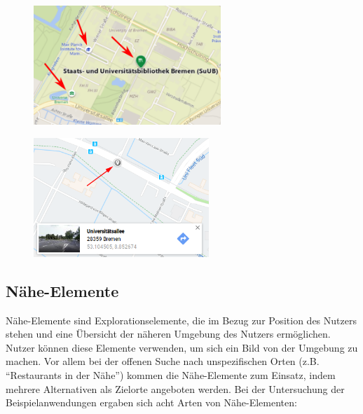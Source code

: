 \begin{figure}
    \centering
    \begin{minipage}[t]{.485\textwidth}
        \centering
        \vspace{0pt}
        \includegraphics[width=\linewidth, height=4.5cm]{figures/map-app_examples/bm_gebaeudemarkierungen_arrows}
        \label{fig:bm_gebaeudemarkierungen}
        \vfill
    \end{minipage}
    \hfill
    \begin{minipage}[t]{.485\textwidth}
        \centering
        \vspace{0pt}
        \includegraphics[width=\linewidth, height=4.5cm]{figures/map-app_examples/gm_klickmarkierung}
        \label{fig:gm_klickmarkierung}
    \end{minipage}
\end{figure}

\subsection{Nähe-Elemente}
\label{ssec:prox-elements}
Nähe-Elemente sind Explorationselemente, die im Bezug zur Position des Nutzers stehen und eine Übersicht der näheren Umgebung des Nutzers ermöglichen.
Nutzer können diese Elemente verwenden, um sich ein Bild von der Umgebung zu machen.
Vor allem bei der offenen Suche nach unspezifischen Orten (z.B. \enquote{Restaurants in der Nähe}) kommen die Nähe-Elemente zum Einsatz, indem mehrere Alternativen als Zielorte angeboten werden.
Bei der Untersuchung der Beispielanwendungen ergaben sich acht Arten von Nähe-Elementen:

